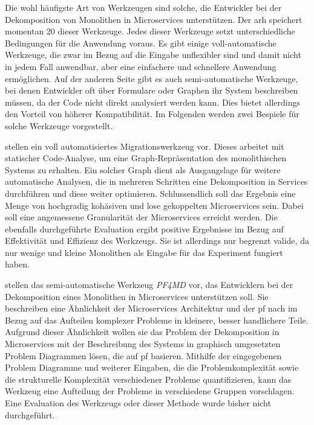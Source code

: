 Die wohl häufigste Art von Werkzeugen sind solche, die Entwickler bei der Dekomposition von Monolithen in Microservices unterstützen.
Der \gls{arh} speichert momentan 20 dieser Werkzeuge.
Jedes dieser Werkzeuge setzt unterschiedliche Bedingungen für die Anwendung voraus.
Es gibt einige voll-automatische Werkzeuge, die zwar im Bezug auf die Eingabe unflexibler sind und damit nicht in jedem Fall anwendbar, aber eine einfachere und schnellere Anwendung ermöglichen.
Auf der anderen Seite gibt es auch semi-automatische Werkzeuge, bei denen Entwickler oft über Formulare oder Graphen ihr System beschreiben müssen, da der Code nicht direkt analysiert werden kann.
Dies bietet allerdings den Vorteil von höherer Kompatibilität.
Im Folgenden werden zwei Bespiele für solche Werkzeuge vorgestellt.

 stellen ein voll automatisiertes Migrationswerkzeug vor.
Dieses arbeitet mit statischer Code-Analyse, um eine Graph-Repräsentation des monolithischen Systems zu erhalten.
Ein solcher Graph dient als Ausgangslage für weitere automatische Analysen, die in mehreren Schritten eine Dekomposition in Services durchführen und diese weiter optimieren.
Schlussendlich soll das Ergebnis eine Menge von hochgradig kohäsiven und lose gekoppelten Microservices sein.
Dabei soll eine angemessene Granularität der Microservices erreicht werden.
Die ebenfalls durchgeführte Evaluation ergibt positive Ergebnisse im Bezug auf Effektivität und Effizienz des Werkzeugs.
Sie ist allerdings nur begrenzt valide, da nur wenige und kleine Monolithen als Eingabe für das Experiment fungiert haben.

 stellen das semi-automatische Werkzeug \emph{PF4MD} vor, das Entwicklern bei der Dekomposition eines Monolithen in Microservices unterstützen soll.
Sie beschreiben eine Ähnlichkeit der Microservices Architektur und der \gls{pf} nach  im Bezug auf das Aufteilen komplexer Probleme in kleinere, besser handlichere Teile.
Aufgrund dieser Ähnlichkeit wollen sie das Problem der Dekomposition in Microservices mit der Beschreibung des Systems in graphisch umgesetzten Problem Diagrammen lösen, die auf \gls{pf} basieren.
Mithilfe der eingegebenen Problem Diagramme und weiterer Eingaben, die die Problemkomplexität sowie die strukturelle Komplexität verschiedener Probleme quantifizieren, kann das Werkzeug eine Aufteilung der Probleme in verschiedene Gruppen vorschlagen.
Eine Evaluation des Werkzeugs oder dieser Methode wurde bisher nicht durchgeführt.

